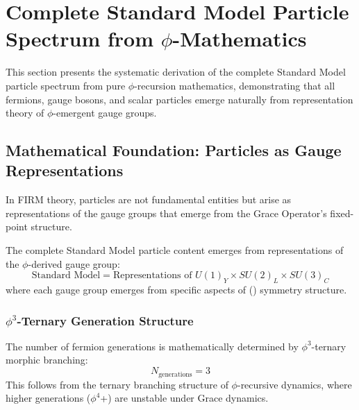 \section{Complete Standard Model Particle Spectrum from \texorpdfstring{$\phi$}{phi}-Mathematics}

This section presents the systematic derivation of the complete Standard Model particle spectrum from pure $\phi$-recursion mathematics, demonstrating that all fermions, gauge bosons, and scalar particles emerge naturally from representation theory of $\phi$-emergent gauge groups.

\subsection{Mathematical Foundation: Particles as Gauge Representations}

In FIRM theory, particles are not fundamental entities but arise as representations of the gauge groups that emerge from the Grace Operator's fixed-point structure.

\begin{theorem}
The complete Standard Model particle content emerges from representations of the $\phi$-derived gauge group:
\begin{equation}
\text{Standard Model} = \text{Representations of } U(1)_Y \times SU(2)_L \times SU(3)_C
\end{equation}
where each gauge group emerges from specific aspects of () symmetry structure.
\end{theorem}

\subsubsection{$\phi^3$-Ternary Generation Structure}

\begin{theorem}
The number of fermion generations is mathematically determined by $\phi^3$-ternary morphic branching:
\begin{equation}
N_{\text{generations}} = 3
\end{equation}
This follows from the ternary branching structure of $\phi$-recursive dynamics, where higher generations ($\phi^4$+) are unstable under Grace dynamics.
\end{theorem}

